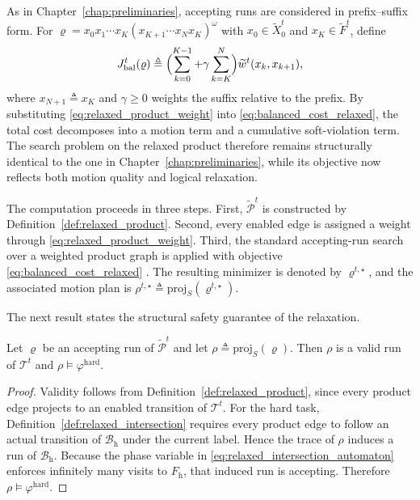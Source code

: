 As in Chapter~\ref{chap:preliminaries}, accepting runs are considered in
prefix--suffix form. For
$\varrho=x_{0}x_{1}\cdots x_{K}(x_{K+1}\cdots x_{N}x_{K})^{\omega}$ with
$x_{0} \in \widetilde{X}_{0}^{t}$ and $x_{K} \in \widetilde{F}^{t}$, define
\begin{equation}
J_{\mathrm{bal}}^{t}(\varrho) \triangleq
\Bigl(\sum_{k=0}^{K-1} + \gamma \sum_{k=K}^{N}\Bigr)
\widetilde{w}^{t}(x_{k},x_{k+1}),
\label{eq:balanced_cost_relaxed}
\end{equation}
where $x_{N+1} \triangleq x_{K}$ and $\gamma \geq 0$ weights the suffix
relative to the prefix. By substituting
\eqref{eq:relaxed_product_weight} into
\eqref{eq:balanced_cost_relaxed}, the total cost decomposes into a motion term
and a cumulative soft-violation term. The search problem on the relaxed product
therefore remains structurally identical to the one in
Chapter~\ref{chap:preliminaries}, while its objective now reflects both motion
quality and logical relaxation.

The computation proceeds in three steps. First,
$\widetilde{\mathcal{P}}^{t}$ is constructed by
Definition~\ref{def:relaxed_product}. Second, every enabled edge is assigned a
weight through \eqref{eq:relaxed_product_weight}. Third, the standard
accepting-run search over a weighted product graph is applied with objective
\eqref{eq:balanced_cost_relaxed}
\cite{smith2011optimal,schuppan2005shortest}. The resulting minimizer is
denoted by $\varrho^{t,\star}$, and the associated motion plan is
$\rho^{t,\star} \triangleq \mathrm{proj}_{S}(\varrho^{t,\star})$.

The next result states the structural safety guarantee of the relaxation.

\begin{theorem}
\label{thm:hard_task_preservation}
Let $\varrho$ be an accepting run of $\widetilde{\mathcal{P}}^{t}$ and let
$\rho \triangleq \mathrm{proj}_{S}(\varrho)$. Then $\rho$ is a valid run of
$\mathcal{T}^{t}$ and $\rho \models \varphi^{\mathrm{hard}}$.
\end{theorem}

\begin{proof}
Validity follows from Definition~\ref{def:relaxed_product}, since every product
edge projects to an enabled transition of $\mathcal{T}^{t}$. For the hard task,
Definition~\ref{def:relaxed_intersection} requires every product edge to follow
an actual transition of $\mathcal{B}_{\mathrm{h}}$ under the current label.
Hence the trace of $\rho$ induces a run of $\mathcal{B}_{\mathrm{h}}$.
Because the phase variable in
\eqref{eq:relaxed_intersection_automaton} enforces infinitely many visits to
$F_{\mathrm{h}}$, that induced run is accepting. Therefore
$\rho \models \varphi^{\mathrm{hard}}$.
\end{proof}


